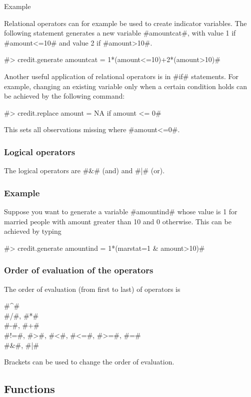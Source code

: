 \begin{stanza}{Example}

Relational operators can for example be used to create indicator
variables. The following statement generates a new variable
#amountcat#, with value 1 if #amount<=10# and value 2 if
#amount>10#.

#> credit.generate amountcat = 1*(amount<=10)+2*(amount>10)#

Another useful application of relational operators is in #if#
statements. For example, changing an existing variable only when a
certain condition holds can be achieved by the following command:

#> credit.replace amount = NA if amount <= 0#

This sets all observations missing where #amount<=0#.
\end{stanza}

\subsubsection{Logical operators}

The logical operators are #&# (and) and #|# (or).

\subsubsection*{Example}

Suppose you want to generate a variable #amountind# whose value is
1 for married people with amount greater than 10 and 0 otherwise.
This can be achieved by typing

#> credit.generate amountind = 1*(marstat=1 & amount>10)#

\subsubsection{Order of evaluation of the operators}

The order of evaluation (from first to last) of operators is

#^# \\
#/#, #*#\\
#-#, #+#\\
#!=#, #>#, #<#, #<=#, #>=#, #=#\\
#&#, #|#

Brackets can be used to change the order of evaluation.


\subsection{Functions}

